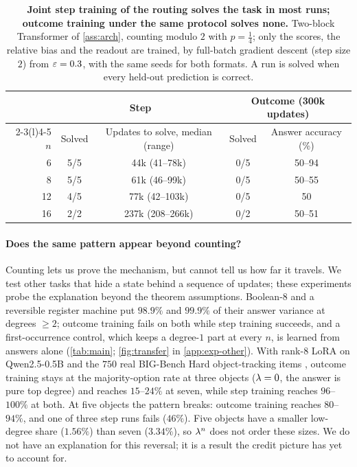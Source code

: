 \begin{table}[t]
\caption{\textbf{Joint step training of the routing solves the task in most runs; outcome training under the same protocol solves
none.} Two-block Transformer of \cref{ass:arch}, counting modulo $2$ with $p=\tfrac{1}{4}$; only the scores, the relative bias and the
readout are trained, by full-batch gradient descent (step size $2$) from $\varepsilon=0.3$, with the same seeds for both formats. A run is
solved when every held-out prediction is correct.}
\label{tab:reach}
\centering\small
\begin{tabular}{@{}rcccc@{}}
\toprule
 & \multicolumn{2}{c}{Step} & \multicolumn{2}{c}{Outcome (300k updates)}\\
\cmidrule(lr){2-3}\cmidrule(l){4-5}
$n$ & Solved & Updates to solve, median (range) & Solved & Answer accuracy (\%)\\
\midrule
6  & 5/5 & 44k (41--78k)   & 0/5 & 50--94\\
8  & 5/5 & 61k (46--99k)   & 0/5 & 50--55\\
12 & 4/5 & 77k (42--103k)  & 0/5 & 50\\
16 & 2/2 & 237k (208--266k) & 0/2 & 50--51\\
\bottomrule
\end{tabular}
\end{table}

\paragraph{Does the same pattern appear beyond counting?} Counting lets us prove the mechanism, but cannot tell us how far it travels.
We test other tasks that hide a state behind a sequence of updates; these experiments probe the explanation beyond the theorem assumptions.
Boolean-8 and a reversible register machine put $98.9\%$ and $99.9\%$ of their answer variance at degrees $\ge2$; outcome
training fails on both while step training succeeds, and a first-occurrence control, which keeps a degree-$1$ part at
every $n$, is learned from answers alone (\cref{tab:main}; \cref{fig:transfer} in \cref{app:exp-other}). With rank-8 LoRA on Qwen2.5-0.5B and the
$750$ real BIG-Bench Hard object-tracking items \citep{suzgun2022challenging}, outcome training stays at the
majority-option rate at three objects ($\lambda=0$, the answer is pure top degree) and reaches $15$--$24\%$ at seven, while
step training reaches $96$--$100\%$ at both. At five objects the pattern breaks: outcome training reaches $80$--$94\%$, and one
of three step runs fails ($46\%$). Five objects have a smaller low-degree share ($1.56\%$) than seven ($3.34\%$), so $\lambda^n$
does not order these sizes. We do not have an explanation for this reversal; it is a result the credit picture has yet to account for.


